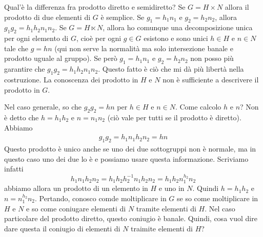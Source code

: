 \documentclass[a4paper]{article}
\begin{document}

Qual'è la differenza fra prodotto diretto e semidiretto?
Se \(G = H \times N\) allora il prodotto di due elementi di \(G\)
è semplice. Se \(g_1 = h_1n_1\) e \(g_2 = h_2n_2\),
allora \(g_1g_2 = h_1h_2n_1n_2\).
Se \(G = H \ltimes N\), allora ho comunque una decomposizione unica per ogni elemento di \(G\),
cioè per ogni \(g\in G\) esistono e sono unici \(h\in H\) e \(n\in N\)
tale che \(g = hn\)
(qui non serve la normalità ma solo intersezione banale e prodotto uguale al gruppo).
Se però \(g_1 = h_1 n_1\) e \(g_2 = h_2n_2\) non posso più garantire che
\(g_1g_2 = h_1h_2n_1n_2\).
Questo fatto è ciò che mi dà più libertà nella costruzione.
La conoscenza dei prodotto in \(H\) e \(N\) non è sufficiente a descrivere
il prodotto in \(G\).


Nel caso generale, so che \(g_2g_2 = hn\)
per \(h\in H\) e \(n\in N\).
Come calcolo \(h\) e \(n\)? Non è detto che \(h=h_1h_2\)
e \(n=n_1n_2\) (ciò vale per tutti se il prodotto è diretto).
Abbiamo
\begin{align*}
    g_1g_2 = h_1n_1h_2n_2 = hn
\end{align*}
Questo prodotto è unico anche se uno dei due sottogruppi non è normale,
ma in questo caso uno dei due lo è e possiamo usare questa informazione.
Scriviamo infatti
\[
    h_1 n_1 h_2 n_2 = h_1h_2h_2^{-1} n_1 h_2 n_2
    = h_1 h_2 n_1^{h_2} n_2
\]
abbiamo allora un prodotto di un elemento in \(H\) e uno in \(N\).
Quindi \(h = h_1h_2\) e \(n = n_1^{h_2}n_2\).
Pertando, conosco comde moltiplicare in \(G\)
se so come moltiplicare in \(H\) e \(N\)
e so come coniugare elementi di \(N\) tramite elementi
di \(H\).
Nel caso particolare del prodotto diretto, questo coniugio è banale.
Quindi, cosa vuol dire dare questa il coniugio
di elementi di \(N\) traimite elementi di \(H\)?
\end{document}
